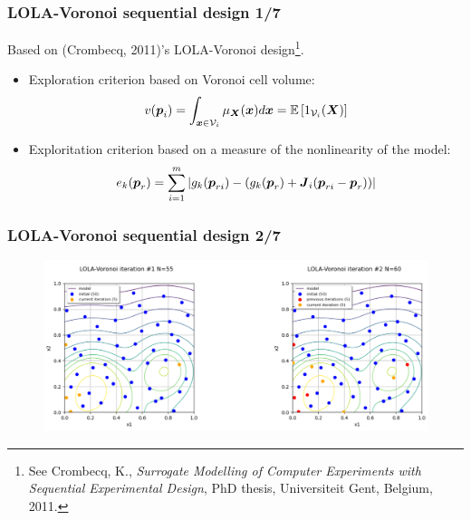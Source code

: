 \documentclass[aspectratio=169]{beamer}
\begin{document}
\begin{frame}
\frametitle{LOLA-Voronoi sequential design 1/7}

Based on (Crombecq, 2011)'s LOLA-Voronoi design\footnote{
See Crombecq, K., \textit{Surrogate Modelling of Computer Experiments with Sequential Experimental Design}, PhD thesis, Universiteit Gent, Belgium, 2011.
}.

\begin{itemize}
\item Exploration criterion based on Voronoi cell volume:
  $$v({\mathbf{\boldsymbol{{p}}}}_i) = \int_{{\mathbf{\boldsymbol{{x}}}} \in \mathcal{V}_i} \mu_{{\mathbf{\boldsymbol{{X}}}}}({\mathbf{\boldsymbol{{x}}}}) d{\mathbf{\boldsymbol{{x}}}} = {\mathbb{E}}\left[ 1_{\mathcal{V}_i}({\mathbf{\boldsymbol{{X}}}}) \right]$$
\item Exploritation criterion based on a measure of the nonlinearity of the model:
  $$e_k({\mathbf{\boldsymbol{{p}}}}_r) = \sum_{i=1}^m | g_k({\mathbf{\boldsymbol{{p}}}}_{ri}) - (g_k({\mathbf{\boldsymbol{{p}}}}_r) + {{\mathbf{\boldsymbol{{{\mathbf{\boldsymbol{{J}}}}}}}}}_i({\mathbf{\boldsymbol{{p}}}}_{ri} - {\mathbf{\boldsymbol{{p}}}}_r)) |$$
\end{itemize}

\end{frame}


\begin{frame}
\frametitle{LOLA-Voronoi sequential design 2/7}

\begin{figure}
   \includegraphics[width=1.0\textwidth]{figures/lolavoronoi_1}
\end{figure}

\end{frame}

\end{document}
